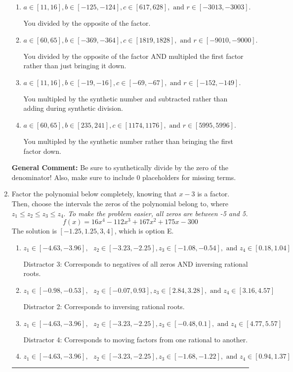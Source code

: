\documentclass{extbook}[14pt]
\newcommand{\litem}[1]{\item #1

\rule{\textwidth}{0.4pt}}
\begin{document}
\begin{enumerate}
{\begin{enumerate}[label=\Alph*.]
* This is the solution!
\item \( a \in [11, 16], b \in [-125, -124], c \in [617, 628], \text{ and } r \in [-3013, -3003]. \)

 You divided by the opposite of the factor.
\item \( a \in [60, 65], b \in [-369, -364], c \in [1819, 1828], \text{ and } r \in [-9010, -9000]. \)

 You divided by the opposite of the factor AND multipled the first factor rather than just bringing it down.
\item \( a \in [11, 16], b \in [-19, -16], c \in [-69, -67], \text{ and } r \in [-152, -149]. \)

 You multipled by the synthetic number and subtracted rather than adding during synthetic division.
\item \( a \in [60, 65], b \in [235, 241], c \in [1174, 1176], \text{ and } r \in [5995, 5996]. \)

 You multipled by the synthetic number rather than bringing the first factor down.
\end{enumerate}

\textbf{General Comment:} Be sure to synthetically divide by the zero of the denominator! Also, make sure to include 0 placeholders for missing terms.
}
\litem{
Factor the polynomial below completely, knowing that $x -3$ is a factor. Then, choose the intervals the zeros of the polynomial belong to, where $z_1 \leq z_2 \leq z_3 \leq z_4$. \textit{To make the problem easier, all zeros are between -5 and 5.}
\[ f(x) = 16x^{4} -112 x^{3} +167 x^{2} +175 x -300 \]The solution is \( [-1.25, 1.25, 3, 4] \), which is option E.\begin{enumerate}[label=\Alph*.]
\item \( z_1 \in [-4.63, -3.96], \text{   }  z_2 \in [-3.23, -2.25], z_3 \in [-1.08, -0.54], \text{   and   } z_4 \in [0.18, 1.04] \)

 Distractor 3: Corresponds to negatives of all zeros AND inversing rational roots.
\item \( z_1 \in [-0.98, -0.53], \text{   }  z_2 \in [-0.07, 0.93], z_3 \in [2.84, 3.28], \text{   and   } z_4 \in [3.16, 4.57] \)

 Distractor 2: Corresponds to inversing rational roots.
\item \( z_1 \in [-4.63, -3.96], \text{   }  z_2 \in [-3.23, -2.25], z_3 \in [-0.48, 0.1], \text{   and   } z_4 \in [4.77, 5.57] \)

 Distractor 4: Corresponds to moving factors from one rational to another.
\item \( z_1 \in [-4.63, -3.96], \text{   }  z_2 \in [-3.23, -2.25], z_3 \in [-1.68, -1.22], \text{   and   } z_4 \in [0.94, 1.37] \)


\end{enumerate}}
\end{enumerate}
\end{document}
